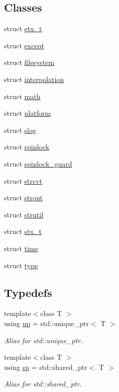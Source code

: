 \subsection*{Classes}
\begin{DoxyCompactItemize}
\item 
struct \hyperlink{structdevfix_1_1base_1_1etx__t}{etx\+\_\+t}
\item 
struct \hyperlink{structdevfix_1_1base_1_1except}{except}
\item 
struct \hyperlink{structdevfix_1_1base_1_1filesystem}{filesystem}
\item 
struct \hyperlink{structdevfix_1_1base_1_1interpolation}{interpolation}
\item 
struct \hyperlink{structdevfix_1_1base_1_1math}{math}
\item 
struct \hyperlink{structdevfix_1_1base_1_1platform}{platform}
\item 
struct \hyperlink{structdevfix_1_1base_1_1slog}{slog}
\item 
struct \hyperlink{structdevfix_1_1base_1_1spinlock}{spinlock}
\item 
struct \hyperlink{structdevfix_1_1base_1_1spinlock__guard}{spinlock\+\_\+guard}
\item 
struct \hyperlink{structdevfix_1_1base_1_1strcvt}{strcvt}
\item 
struct \hyperlink{structdevfix_1_1base_1_1strout}{strout}
\item 
struct \hyperlink{structdevfix_1_1base_1_1strutil}{strutil}
\item 
struct \hyperlink{structdevfix_1_1base_1_1stx__t}{stx\+\_\+t}
\item 
struct \hyperlink{structdevfix_1_1base_1_1time}{time}
\item 
struct \hyperlink{structdevfix_1_1base_1_1type}{type}
\end{DoxyCompactItemize}
\subsection*{Typedefs}
\begin{DoxyCompactItemize}
\item 
{\footnotesize template$<$class T $>$ }\\using \hyperlink{namespacedevfix_1_1base_a18dfbd492717795cee1cfa6f14a8f724}{up} = std\+::unique\+\_\+ptr$<$ T $>$
\begin{DoxyCompactList}\small\item\em Alias for std\+::unique\+\_\+ptr. \end{DoxyCompactList}\item 
{\footnotesize template$<$class T $>$ }\\using \hyperlink{namespacedevfix_1_1base_ad239a07977b9e77ffabaf558636d0b8b}{sp} = std\+::shared\+\_\+ptr$<$ T $>$
\begin{DoxyCompactList}\small\item\em Alias for std\+::shared\+\_\+ptr. \end{DoxyCompactList}\end{DoxyCompactItemize}
